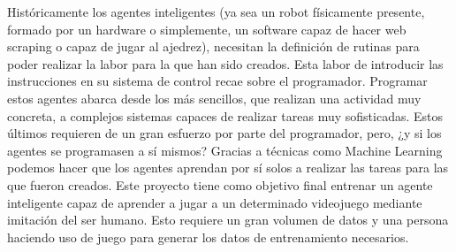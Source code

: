 
Históricamente los agentes inteligentes (ya sea un robot físicamente presente, formado por un hardware o simplemente, un software capaz de hacer web scraping o capaz de jugar al ajedrez), necesitan la definición de rutinas para poder realizar la labor para la que han sido creados. Esta labor de introducir las instrucciones en su sistema de control recae sobre el programador. Programar estos agentes abarca desde los más sencillos, que realizan una actividad muy concreta, a complejos sistemas capaces de realizar tareas muy sofisticadas. Estos últimos requieren de un gran esfuerzo por parte del programador, pero, ¿y si los agentes se programasen a sí mismos? Gracias a técnicas como Machine Learning podemos hacer que los agentes aprendan por sí solos a realizar las tareas para las que fueron creados.
Este proyecto tiene como objetivo final entrenar un agente inteligente capaz de aprender a jugar a un determinado videojuego mediante imitación del ser humano. Esto requiere un gran volumen de datos y una persona haciendo uso de juego para generar los datos de entrenamiento necesarios.
